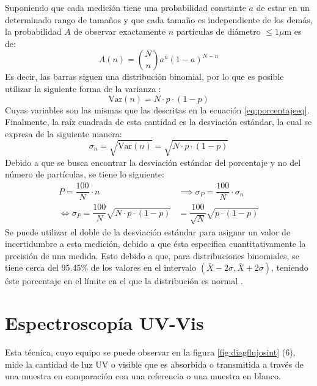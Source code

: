 \documentclass[../main.tex]{subfiles}
\begin{document}
Suponiendo que cada medición tiene una probabilidad constante $a$ de estar en un determinado rango de tamaños y que cada tamaño es independiente de los demás, la probabilidad $A$ de observar exactamente $n$ partículas de diámetro $\leq 1\mu$m es de:
\begin{equation}
    A(n)=\binom{N}{n}a^n(1-a)^{N-n}
    \label{eq:binomdist}
\end{equation}
Es decir, las barras siguen una distribución binomial, por lo que es posible utilizar la siguiente forma de la varianza \cite{Stephenson2005}:
\begin{equation}
    \text{Var}(n)=N\cdot p\cdot(1-p)
    \label{eq:varianza}
\end{equation}
Cuyas variables son las mismas que las descritas en la ecuación \ref{eq:porcentajeeq}. Finalmente, la raíz cuadrada de esta cantidad es la desviación estándar, la cual se expresa de la siguiente manera:
\begin{equation}
    \sigma_n=\sqrt{\text{Var}(n)}=\sqrt{N\cdot p\cdot(1-p)}
    \label{eq:desviacionsinescalar}
\end{equation}
Debido a que se busca encontrar la desviación estándar del porcentaje y no del número de partículas, se tiene lo siguiente:
\begin{equation}
    \begin{split}
        P=\dfrac{100}{N}\cdot n&\implies\sigma_P=\dfrac{100}{N}\cdot\sigma_n\\
        \iff \sigma_P=\dfrac{100}{N}\sqrt{N\cdot p\cdot(1-p)}&=\dfrac{100}{\sqrt{N}}\sqrt{p\cdot(1-p)}
    \end{split}
    \label{eq:desvest}
\end{equation}
Se puede utilizar el doble de la desviación estándar para asignar un valor de incertidumbre a esta medición, debido a que ésta especifica cuantitativamente la precisión de una medida. Esto debido a que, para distribuciones binomiales, se tiene cerca del 95.45\% de los valores en el intervalo $(\bar{X}-2\sigma,\bar{X}+2\sigma)$, teniendo éste porcentaje en el límite en el que la distribución es normal \cite{bertaoda}.
\section{Espectroscopía UV-Vis}\label{sec:uvvismetod}
Esta técnica, cuyo equipo se puede observar en la figura \ref{fig:diagflujosint} (6), mide la cantidad de luz UV o visible que es absorbida o transmitida a través de una muestra en comparación con una referencia o una muestra en blanco.
\end{document}
